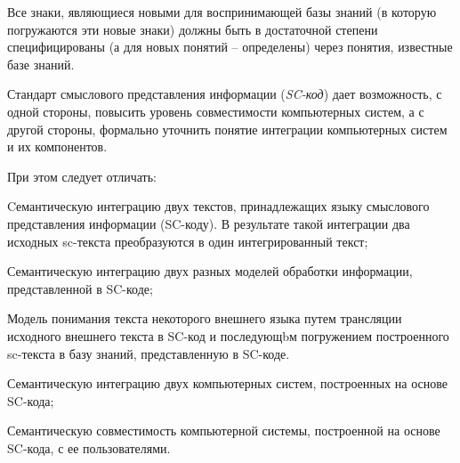 \begin{SCn}
{Все знаки, являющиеся новыми для воспринимающей базы знаний (в которую погружаются эти новые знаки) должны быть в достаточной степени специфицированы (а для новых понятий -- определены) через понятия, известные базе знаний.

Стандарт смыслового представления информации (\textit{SC-код}) дает возможность, с одной стороны, повысить уровень совместимости компьютерных систем, а с другой стороны, формально уточнить понятие интеграции компьютерных систем и их компонентов. 

При этом следует отличать: 
\begin{scnitemize}
    \item Cемантическую интеграцию двух текстов, принадлежащих языку смыслового представления информации (SC-коду). В результате такой интеграции два исходных sc-текста преобразуются в один интегрированный текст;
    \item Семантическую интеграцию двух разных моделей обработки информации, представленной в SC-коде;
    \item Модель понимания текста некоторого внешнего языка путем трансляции исходного внешнего текста в SC-код и последующbм погружением построенного sc-текста в базу знаний, представленную в SC-коде.
    \item Семантическую интеграцию двух компьютерных систем, построенных на основе SC-кода;
    \item Семантическую совместимость компьютерной системы, построенной на основе SC-кода, с ее пользователями.
\end{scnitemize}
}

\scnendstruct

\end{SCn}